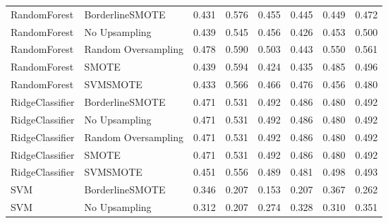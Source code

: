 \begin{tabular}{llllllll}
                RandomForest &     BorderlineSMOTE & 0.431 &                     0.576 &                 0.455 &                  0.445 &                                   0.449 &     0.472 \\
                RandomForest &       No Upsampling & 0.439 &                     0.545 &                 0.456 &                  0.426 &                                   0.453 &     0.500 \\
                RandomForest & Random Oversampling & 0.478 &                     0.590 &                 0.503 &                  0.443 &                                   0.550 &     0.561 \\
                RandomForest &               SMOTE & 0.439 &                     0.594 &                 0.424 &                  0.435 &                                   0.485 &     0.496 \\
                RandomForest &            SVMSMOTE & 0.433 &                     0.566 &                 0.466 &                  0.476 &                                   0.456 &     0.480 \\
             RidgeClassifier &     BorderlineSMOTE & 0.471 &                     0.531 &                 0.492 &                  0.486 &                                   0.480 &     0.492 \\
             RidgeClassifier &       No Upsampling & 0.471 &                     0.531 &                 0.492 &                  0.486 &                                   0.480 &     0.492 \\
             RidgeClassifier & Random Oversampling & 0.471 &                     0.531 &                 0.492 &                  0.486 &                                   0.480 &     0.492 \\
             RidgeClassifier &               SMOTE & 0.471 &                     0.531 &                 0.492 &                  0.486 &                                   0.480 &     0.492 \\
             RidgeClassifier &            SVMSMOTE & 0.451 &                     0.556 &                 0.489 &                  0.481 &                                   0.498 &     0.493 \\
                         SVM &     BorderlineSMOTE & 0.346 &                     0.207 &                 0.153 &                  0.207 &                                   0.367 &     0.262 \\
                         SVM &       No Upsampling & 0.312 &                     0.207 &                 0.274 &                  0.328 &                                   0.310 &     0.351 \\

\end{tabular}
